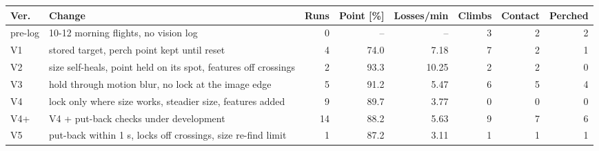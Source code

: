 \begin{tabular}{llrrrrrr}
\toprule
Ver. & Change & Runs & Point [\%] & Losses/min & Climbs & Contact & Perched \\
\midrule
pre-log & 10-12 morning flights, no vision log & 0 & -- & -- & 3 & 2 & 2 \\
V1 & stored target, perch point kept until reset & 4 & 74.0 & 7.18 & 7 & 2 & 1 \\
V2 & size self-heals, point held on its spot, features off crossings & 2 & 93.3 & 10.25 & 2 & 2 & 0 \\
V3 & hold through motion blur, no lock at the image edge & 5 & 91.2 & 5.47 & 6 & 5 & 4 \\
V4 & lock only where size works, steadier size, features added & 9 & 89.7 & 3.77 & 0 & 0 & 0 \\
V4+ & V4 + put-back checks under development & 14 & 88.2 & 5.63 & 9 & 7 & 6 \\
V5 & put-back within 1 s, locks off crossings, size re-find limit & 1 & 87.2 & 3.11 & 1 & 1 & 1 \\
\bottomrule
\end{tabular}
